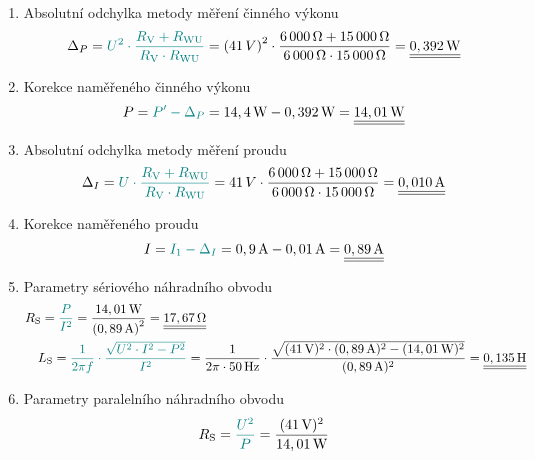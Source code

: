 \documentclass[a4paper, czech]{article}
\begin{document}
\begin{enumerate}
    \item Absolutní odchylka metody měření činného výkonu
    \begin{multline*}
        \Delta_P = \textcolor{teal}{U^2 \cdot \frac{R_\text{V} + R_\text{WU}}{R_\text{V} \cdot R_\text{WU}}}
        = \left(41\,V \right)^2 \cdot \frac{6\,000\,\Omega + 15\,000\,\Omega}{6\,000\,\Omega \cdot 15\,000\,\Omega} =
        \underline{\underline{0,392\,\text{W}}} \hfill
    \end{multline*}
    \item Korekce naměřeného činného výkonu
    \begin{multline*}
        P = \textcolor{teal}{P' - \Delta_P} = 14,4\,\text{W} - 0,392\,\text{W} = \underline{\underline{14,01\,\text{W}}} \hfill
    \end{multline*}
    \item Absolutní odchylka metody měření proudu
    \begin{multline*}
        \Delta_I = \textcolor{teal}{U \cdot \frac{R_\text{V} + R_\text{WU}}{R_\text{V} \cdot R_\text{WU}}}
        = 41\,V \cdot \frac{6\,000\,\Omega + 15\,000\,\Omega}{6\,000\,\Omega \cdot 15\,000\,\Omega} =
        \underline{\underline{0,010\,\text{A}}} \hfill
    \end{multline*}
    \item Korekce naměřeného proudu
    \begin{multline*}
        I = \textcolor{teal}{I_1 - \Delta_I} = 0,9\,\text{A} - 0,01\,\text{A} = \underline{\underline{0,89\,\text{A}}} \hfill
    \end{multline*}
    \item Parametry sériového náhradního obvodu
    \begin{multline*}
        R_\text{S} = \textcolor{teal}{\frac{P}{I^2}} = \frac{14,01\,\text{W}}{\left(0,89\,\text{A}\right)^2}
        = \underline{\underline{17,67\,\Omega}} \hfill \\
        \ \ \ L_\text{S} = \textcolor{teal}{\frac{1}{2 \pi f} \cdot \frac{\sqrt{U^2 \cdot I^2 - P^2}}{I^2}}
        = \frac{1}{2 \pi \cdot 50\,\text{Hz}} \cdot \frac{\sqrt{(41\,\text{V})^2 \cdot (0,89\,\text{A})^2 - (14,01\,\text{W})^2}}{(0,89\,\text{A})^2} = 
        \underline{\underline{0,135\,\text{H}}} \hfill
    \end{multline*}
    \item Parametry paralelního náhradního obvodu
    \begin{multline*}
        R_\text{S} = \textcolor{teal}{\frac{U^2}{P}} = \frac{(41\,\text{V})^2}{14,01\,\text{W}}

\end{multline*}
\end{enumerate}
\end{document}
